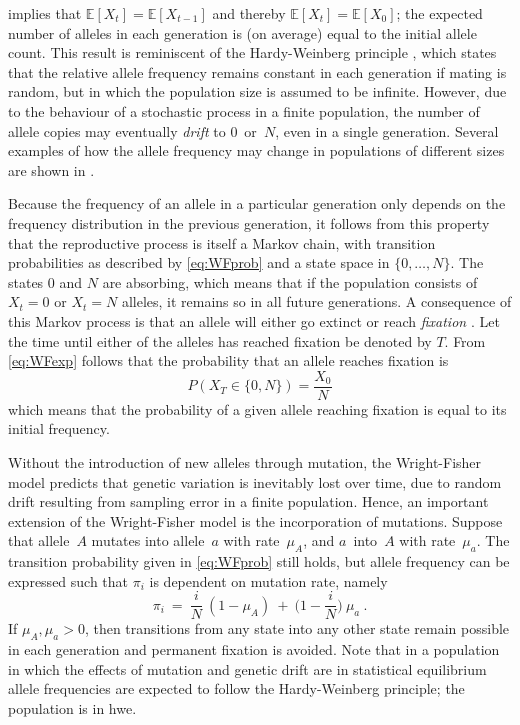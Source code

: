  implies that ${\mathbb{E}[X_t] = \mathbb{E}[X_{t-1}]}$ and thereby ${\mathbb{E}[X_t] = \mathbb{E}[X_0]}$; \ie the expected number of alleles in each generation is (on average) equal to the initial allele count.
This result is reminiscent of the Hardy-Weinberg principle \citep{Hardy:1908wx,Weinberg:1908tr}, which states that the relative allele frequency remains constant in each generation if mating is random, but in which the population size is assumed to be infinite.
However, due to the behaviour of a stochastic process in a finite population, the number of allele copies may eventually \emph{drift} to $0$~or~$N$, even in a single generation.
Several examples of how the allele frequency may change in populations of different sizes are shown in .

%

%

Because the frequency of an allele in a particular generation only depends on the frequency distribution in the previous generation, it follows from this property that the reproductive process is itself a Markov chain, with transition probabilities as described by \cref{eq:WFprob} and a state space in $\{0,\ldots,N\}$.
The states $0$ and $N$ are absorbing, which means that if the population consists of ${X_t=0}$ or ${X_t=N}$ alleles, it remains so in all future generations.
A consequence of this Markov process is that an allele will either go extinct or reach \emph{fixation} \citep[\eg, see][]{ewens2012}.
Let the time until either of the  alleles has reached fixation be denoted by $T$.
From \cref{eq:WFexp} follows that the probability that an allele reaches fixation is
\begin{equation}
	P(X_T \in \{0,N\}) = \frac{X_0}{N}
\end{equation}
which means that the probability of a given allele reaching fixation is equal to its initial frequency.

Without the introduction of new alleles through mutation, the Wright-Fisher model predicts that genetic variation is inevitably lost over time, due to random drift resulting from sampling error in a finite population. \label{ref:mutgendiv}
Hence, an important extension of the Wright-Fisher model is the incorporation of mutations.
Suppose that allele~$A$ mutates into allele~$a$ with rate~$\mu_A$, and $a$~into~$A$ with rate~$\mu_a$.
The transition probability given in \cref{eq:WFprob} still holds, but allele frequency can be expressed such that $\pi_i$ is dependent on mutation rate, namely
\begin{equation}
	\pi_i ~=~ \frac{i}{N} ~ (1 - \mu_A) ~+~ \Big( 1 - \frac{i}{N} \Big) ~ \mu_a \ .
\end{equation}
If ${\mu_A, \mu_a > 0}$, then transitions from any state into any other state remain possible in each generation and permanent fixation is avoided.
Note that in a population in which the effects of mutation and genetic drift are in statistical equilibrium allele frequencies are expected to follow the Hardy-Weinberg principle; \ie the population is in \gls{hwe}.


